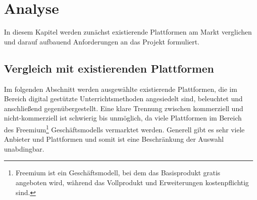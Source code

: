 \section{Analyse}\label{sec:analyse}
In diesem Kapitel werden zunächst existierende Plattformen am Markt verglichen und darauf aufbauend Anforderungen an das Projekt formuliert.
\subsection{Vergleich mit existierenden Plattformen}\label{sec:vergleichplat}
Im folgenden Abschnitt werden ausgewählte existierende Plattformen, die im Bereich 
digital gestützte Unterrichtsmethoden angesiedelt sind, beleuchtet und anschließend 
gegenübergestellt. Eine klare Trennung zwischen kommerziell und nicht-kommerziell ist schwierig bis unmöglich, da viele Plattformen im Bereich des Freemium\footnote{Freemium ist ein Geschäftsmodell, bei dem das Basisprodukt gratis angeboten wird, während das Vollprodukt und Erweiterungen kostenpflichtig sind.} Geschäftsmodells vermarktet werden. Generell gibt es sehr viele Anbieter und Plattformen und somit ist eine Beschränkung der Auswahl unabdingbar. 

